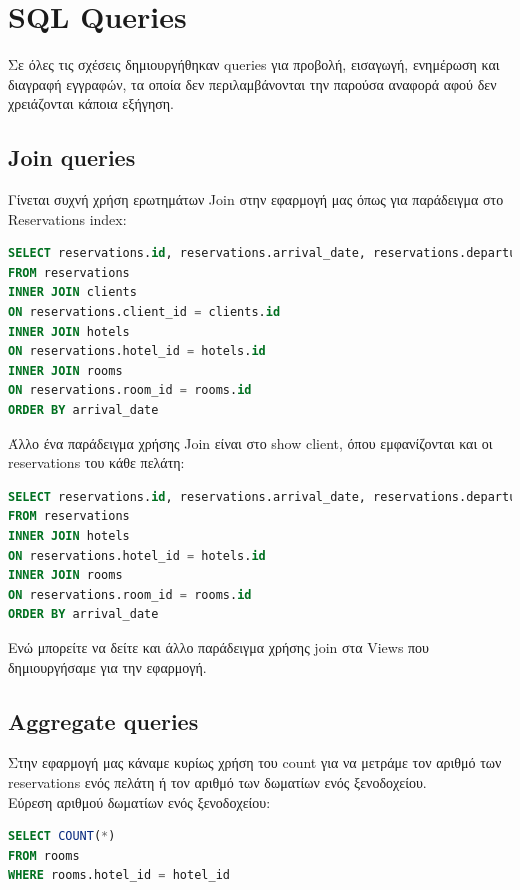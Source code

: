 \documentclass[a4paper,12pt]{article}
\begin{document}
\section{SQL Queries}
Σε όλες τις σχέσεις δημιουργήθηκαν queries για προβολή, εισαγωγή, ενημέρωση και διαγραφή εγγραφών, τα οποία δεν περιλαμβάνονται την παρούσα αναφορά αφού δεν χρειάζονται κάποια εξήγηση.

	\subsection{Join queries}
	Γίνεται συχνή χρήση ερωτημάτων Join στην εφαρμογή μας όπως για παράδειγμα στο Reservations index:
	\begin{lstlisting}[language=SQL]
SELECT reservations.id, reservations.arrival_date, reservations.departure_date, reservations.created_at, reservations.updated_at, clients.first_name, clients.last_name, hotels.name, rooms.room_type
FROM reservations
INNER JOIN clients
ON reservations.client_id = clients.id
INNER JOIN hotels
ON reservations.hotel_id = hotels.id
INNER JOIN rooms
ON reservations.room_id = rooms.id
ORDER BY arrival_date
	\end{lstlisting}
	Άλλο ένα παράδειγμα χρήσης Join είναι στο show client, όπου εμφανίζονται και οι reservations του κάθε πελάτη:
	\begin{lstlisting}[language=SQL]
SELECT reservations.id, reservations.arrival_date, reservations.departure_date, reservations.created_at, reservations.updated_at, hotels.name, rooms.room_type
FROM reservations
INNER JOIN hotels
ON reservations.hotel_id = hotels.id
INNER JOIN rooms
ON reservations.room_id = rooms.id
ORDER BY arrival_date
	\end{lstlisting}
	Ενώ μπορείτε να δείτε και άλλο παράδειγμα χρήσης join στα Views που δημιουργήσαμε για την εφαρμογή.
	
	\subsection{Aggregate queries}
	Στην εφαρμογή μας κάναμε κυρίως χρήση του count για να μετράμε τον αριθμό των reservations ενός πελάτη ή τον αριθμό των δωματίων ενός ξενοδοχείου.\\

	Εύρεση αριθμού δωματίων ενός ξενοδοχείου:  
	\begin{lstlisting}[language=SQL]
SELECT COUNT(*) 
FROM rooms 
WHERE rooms.hotel_id = hotel_id
	\end{lstlisting}
	
\end{document}

